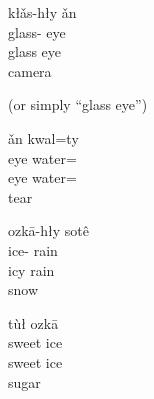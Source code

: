 \begin{exe}
    \ex
    \glll
    kłǎs-hły ǎn \\
    glass-\Adj{} eye \\
    glass eye \\
    \glt
    camera
\end{exe}
(or simply ``glass eye'')

\begin{exe}
    \ex
    \glll
    ǎn kwal=ty  \\
    eye water=\Poss{} \\
    eye water=\Poss{} \\
    \glt
    tear
\end{exe}

\begin{exe}
    \ex
    \glll
    ozkā-hły sotê \\
    ice-\Adj{} rain \\
    icy rain \\
    \glt
    snow
\end{exe}

\begin{exe}
    \ex
    \glll
    tùł ozkā \\
    sweet ice \\
    sweet ice \\
    \glt
    sugar
\end{exe}